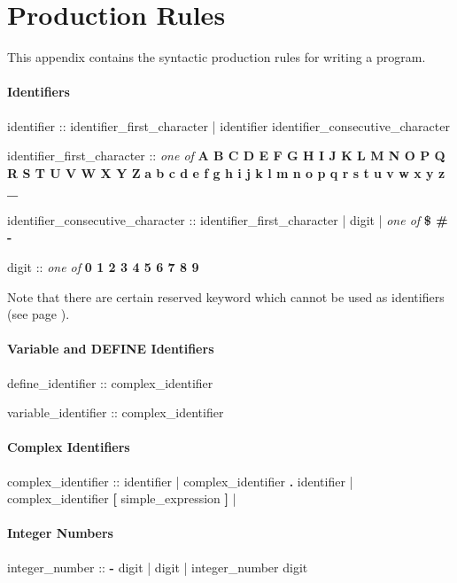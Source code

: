 \chapter{Production Rules}
This appendix contains the syntactic production rules for writing a \nusmv program.


\subsubsection{Identifiers}
\begin{Grammar}
identifier :: 
        identifier_first_character
      | identifier identifier_consecutive_character

identifier_first_character :: \emph{one of}
        \textbf{A B C D E F G H I J K L M N O P Q R S T U V W X Y Z}
        \textbf{a b c d e f g h i j k l m n o p q r s t u v w x y z _}

identifier_consecutive_character :: 
        identifier_first_character
      | digit
      | \emph{one of} \textbf{\$ \# -}

digit :: \emph{one of} \textbf{0 1 2 3 4 5 6 7 8 9}
\end{Grammar}

Note that there are certain reserved keyword which cannot be used as
identifiers (see page \pageref{list of reserved keywords}).

\subsubsection{Variable and DEFINE Identifiers}
\begin{Grammar}
define_identifier :: complex_identifier

variable_identifier :: complex_identifier
\end{Grammar}


\subsubsection{Complex Identifiers}
\begin{Grammar}
complex_identifier ::
        identifier
      | complex_identifier \textbf{.} identifier
      | complex_identifier \textbf{[} simple_expression \textbf{]}
      | 
\end{Grammar}


\subsubsection{Integer Numbers}
\begin{Grammar}
integer_number ::
        \textbf{-} digit
      | digit
      | integer_number digit
\end{Grammar}


